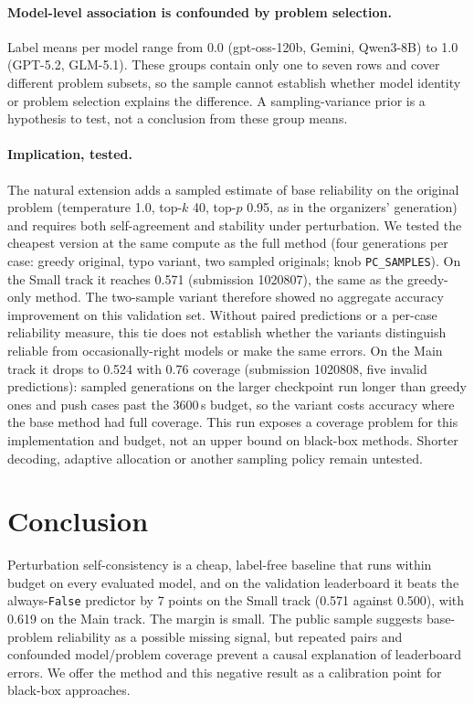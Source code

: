 \documentclass{article}
\begin{document}
\paragraph{Model-level association is confounded by problem selection.} Label means per model range from 0.0 (gpt-oss-120b, Gemini, Qwen3-8B) to 1.0 (GPT-5.2, GLM-5.1). These groups contain only one to seven rows and cover different problem subsets, so the sample cannot establish whether model identity or problem selection explains the difference. A sampling-variance prior is a hypothesis to test, not a conclusion from these group means.
\paragraph{Implication, tested.} The natural extension adds a sampled estimate of base reliability on the original problem (temperature 1.0, top-$k$ 40, top-$p$ 0.95, as in the organizers' generation) and requires both self-agreement and stability under perturbation. We tested the cheapest version at the same compute as the full method (four generations per case: greedy original, typo variant, two sampled originals; knob \texttt{PC\_SAMPLES}). On the Small track it reaches 0.571 (submission 1020807), the same as the greedy-only method. The two-sample variant therefore showed no aggregate accuracy improvement on this validation set. Without paired predictions or a per-case reliability measure, this tie does not establish whether the variants distinguish reliable from occasionally-right models or make the same errors. On the Main track it drops to 0.524 with 0.76 coverage (submission 1020808, five invalid predictions): sampled generations on the larger checkpoint run longer than greedy ones and push cases past the 3600\,s budget, so the variant costs accuracy where the base method had full coverage. This run exposes a coverage problem for this implementation and budget, not an upper bound on black-box methods. Shorter decoding, adaptive allocation or another sampling policy remain untested.

\section{Conclusion}
Perturbation self-consistency is a cheap, label-free baseline that runs within budget on every evaluated model, and on the validation leaderboard it beats the always-\texttt{False} predictor by 7 points on the Small track (0.571 against 0.500), with 0.619 on the Main track. The margin is small. The public sample suggests base-problem reliability as a possible missing signal, but repeated pairs and confounded model/problem coverage prevent a causal explanation of leaderboard errors. We offer the method and this negative result as a calibration point for black-box approaches.
\end{document}
